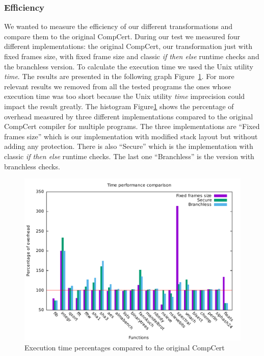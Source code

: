 \documentclass[11pt]{sdm}
\begin{document}
\subsubsection{Efficiency}
\label{ssub:Efficiency}

We wanted to measure the efficiency of our different transformations and compare them to the original CompCert. During our test we measured four different implementations: the original CompCert, our transformation just with fixed frames size, with fixed frame size and classic \textit{if then else} runtime checks and the branchless version.
To calculate the execution time we used the Unix utility \textit{time}.
The results are presented in the following graph Figure~\ref{time_percentage_graph}.
For more relevant results we removed from all the tested programs the ones whose execution time was too short because the Unix utility \textit{time} imprecision could impact the result greatly.
The histogram Figure\ref{time_percentage_graph} shows the percentage of overhead measured by three different implementations compared to the original CompCert compiler for multiple programs.
The three implementations are ``Fixed frames size'' which is our implementation with modified stack layout but without adding any protection. There is also ``Secure'' which is the implementation with classic \textit{if then else} runtime checks. The last one ``Branchless'' is the version with branchless checks.

\begin{figure}[!ht]
\centering
\includegraphics[width=1\textwidth]{images/time_percentage_graph.pdf}
\caption{Execution time percentages compared to the original CompCert}
\label{time_percentage_graph}
\end{figure}
\end{document}
